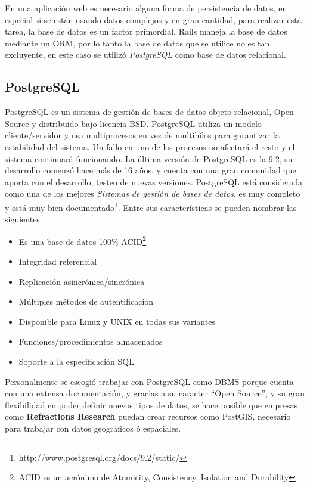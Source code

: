     En una aplicación web es necesario alguna forma de persistencia de datos, en especial si se están usando datos complejos y en gran cantidad, para realizar está tarea, la base de datos es un factor primordial.
    Rails maneja la base de datos mediante  un ORM, por lo tanto la base de datos que se utilice no es tan excluyente, en este caso se utilizó  \emph{PostgreSQL} como base de datos relacional.\\

    \subsection{PostgreSQL} %
    \label{sec:postgres}

      PostgreSQL es un sistema de gestión de bases de datos objeto-relacional, Open Source y distribuido bajo licencia BSD. 
      PostgreSQL utiliza un modelo cliente/servidor y usa multiprocesos en vez de multihilos para garantizar la estabilidad del sistema. Un fallo en uno de los procesos no afectará el resto y el sistema continuará funcionando.
      La última versi\'on de PostgreSQL es la 9.2, su desarrollo comenz\'o hace más de 16 años, y cuenta con una gran comunidad que aporta con el desarrollo, testeo de nuevas versiones.
      PostgreSQL  está considerada como una de los mejores \emph{Sistemas de gesti\'on de bases de datos}, es muy completo y está muy bien documentado\footnote{ http://www.postgresql.org/docs/9.2/static/}. 
      Entre sus características se pueden nombrar las siguientes.
      \begin{itemize}
        \item Es una base de datos 100\% ACID\footnote{  ACID es un acrónimo de Atomicity, Consistency, Isolation and Durability}
        \item Integridad referencial
        \item Replicación asincrónica/sincrónica
        \item Múltiples métodos de autentificación
        \item Disponible para Linux y UNIX en todas sus variantes
        \item Funciones/procedimientos almacenados
        \item Soporte a la especificaci\'on SQL
      \end{itemize}

      Personalmente se escogió trabajar con  PostgreSQL como DBMS
      porque cuenta con una extensa documentación,  y gracias a su caracter ``Open Source'', y su gran flexibilidad en poder definir nuevos tipos de datos, 
      se hace posible que empresas como \textbf{Refractions Research} puedan crear recursos como PostGIS, necesario para trabajar con datos geográficos \'o espaciales.

